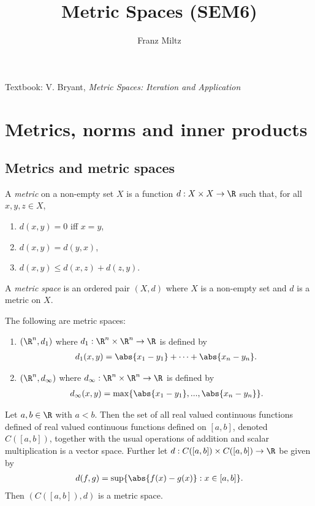 \documentclass{article}
\begin{document}
\mkthmstwounified
\title{Metric Spaces (SEM6)}
\author{Franz Miltz}
\maketitle
\noindent Textbook: V. Bryant, \emph{Metric Spaces: Iteration and Application}
\tableofcontents
\pagebreak

\section{Metrics, norms and inner products}

\subsection{Metrics and metric spaces}

\begin{definition}
	A \emph{metric} on a non-empty set $X$ is a function $d:X\times X\to\R$
	such that, for all $x,y,z\in X$,
	\begin{enumerate}
		\item $d(x,y)=0$ iff $x=y$,
		\item $d(x,y)=d(y,x)$,
		\item $d(x,y)\leq d(x,z) + d(z,y)$.
	\end{enumerate}
	A \emph{metric space} is an ordered pair $(X,d)$ where $X$ is a non-empty set and
	$d$ is a metric on $X$.
\end{definition}

\begin{lemma}
	The following are metric spaces:
	\begin{enumerate}
		\item $(\R^n, d_1)$ where $d_1:\R^n\times\R^n\to\R$ is defined by \begin{align*}
			      d_1(x,y)=\abs{x_1-y_1}+\cdots+\abs{x_n-y_n}.
		      \end{align*}
		\item $(\R^n, d_\infty)$ where $d_\infty:\R^n\times\R^n\to\R$ is defined by \begin{align*} d_\infty(x,y)=\max\{\abs{x_1-y_1},...,\abs{x_n-y_n}\}.
		      \end{align*}
	\end{enumerate}
\end{lemma}

\begin{lemma}
	Let $a,b\in\R$ with $a<b$.
	Then the set of all real valued continuous functions defined of real valued
	continuous functions defined on $[a,b]$, denoted $C([a,b])$, together with
	the usual operations of addition and scalar multiplication is a vector space.
	Further let $d:C([a,b])\times C([a,b])\to \R$ be given by
	\begin{align}
		\label{metric-cab}
		d(f,g)=\sup\{\abs{f(x)-g(x)}:x\in[a,b]\}.
	\end{align}
	Then $(C([a,b]),d)$ is a metric space.
\end{lemma}
\end{document}
